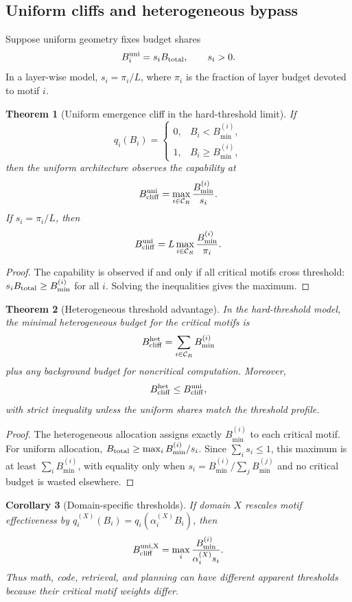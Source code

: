 \documentclass[11pt]{article}
\newtheorem{theorem}{Theorem}[section]
\newtheorem{corollary}[theorem]{Corollary}
\theoremstyle{definition}
\newcommand{\calC}{\mathcal{C}}
\begin{document}
\subsection{Uniform cliffs and heterogeneous bypass}

Suppose uniform geometry fixes budget shares
\[
B_i^{\rm uni}=s_iB_{\rm total},\qquad s_i>0.
\]
In a layer-wise model, \(s_i=\pi_i/L\), where \(\pi_i\) is the fraction of layer budget devoted to motif \(i\).

\begin{theorem}[Uniform emergence cliff in the hard-threshold limit]
If
\[
q_i(B_i)=\begin{cases}0,&B_i<B_{\min}^{(i)},\\1,&B_i\ge B_{\min}^{(i)},\end{cases}
\]
then the uniform architecture observes the capability at
\[
B_{\rm cliff}^{\rm uni}=\max_{i\in\calC_R}\frac{B_{\min}^{(i)}}{s_i}.
\]
If \(s_i=\pi_i/L\), then
\[
B_{\rm cliff}^{\rm uni}=L\max_{i\in\calC_R}\frac{B_{\min}^{(i)}}{\pi_i}.
\]
\end{theorem}

\begin{proof}
The capability is observed if and only if all critical motifs cross threshold: \(s_iB_{\rm total}\ge B_{\min}^{(i)}\) for all \(i\). Solving the inequalities gives the maximum.
\end{proof}

\begin{theorem}[Heterogeneous threshold advantage]
In the hard-threshold model, the minimal heterogeneous budget for the critical motifs is
\[
B_{\rm cliff}^{\rm het}=\sum_{i\in\calC_R}B_{\min}^{(i)}
\]
plus any background budget for noncritical computation. Moreover,
\[
B_{\rm cliff}^{\rm het}\le B_{\rm cliff}^{\rm uni},
\]
with strict inequality unless the uniform shares match the threshold profile.
\end{theorem}

\begin{proof}
The heterogeneous allocation assigns exactly \(B_{\min}^{(i)}\) to each critical motif. For uniform allocation, \(B_{\rm total}\ge\max_iB_{\min}^{(i)}/s_i\). Since \(\sum_i s_i\le 1\), this maximum is at least \(\sum_iB_{\min}^{(i)}\), with equality only when \(s_i=B_{\min}^{(i)}/\sum_jB_{\min}^{(j)}\) and no critical budget is wasted elsewhere.
\end{proof}

\begin{corollary}[Domain-specific thresholds]
If domain \(X\) rescales motif effectiveness by \(q_i^{(X)}(B_i)=q_i(\alpha_i^{(X)}B_i)\), then
\[
B_{\rm cliff}^{\rm uni,X}=\max_i\frac{B_{\min}^{(i)}}{\alpha_i^{(X)}s_i}.
\]
Thus math, code, retrieval, and planning can have different apparent thresholds because their critical motif weights differ.
\end{corollary}
\end{document}
